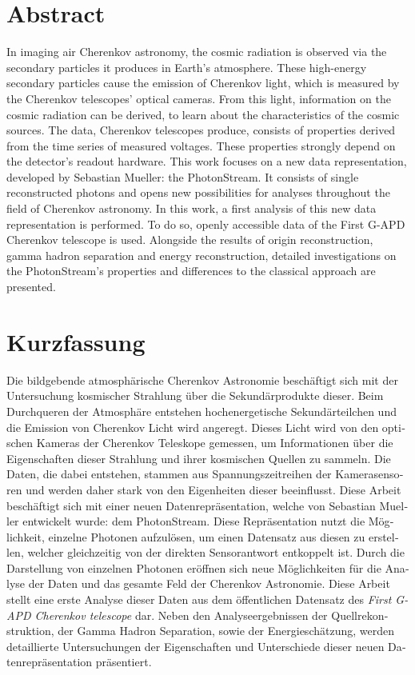 \section*{\color{tugreen}Abstract}
%
In imaging air Cherenkov astronomy, the cosmic radiation is observed via the
secondary particles it produces in Earth's atmosphere. These high-energy secondary
particles cause the emission of Cherenkov light, which is measured by the
Cherenkov telescopes' optical cameras. From this light, information on the
cosmic radiation can be derived, to learn about the characteristics of the
cosmic sources. The data, Cherenkov telescopes produce, consists of
properties derived from the time series of measured voltages. These properties
strongly depend on the detector's readout hardware. This work focuses on a new
data representation, developed by Sebastian Mueller: the PhotonStream. It
consists of single reconstructed photons and opens new possibilities for
analyses throughout the field of Cherenkov astronomy. In this work, a first analysis of this new data representation is
performed. To do so, openly accessible data of the First G-APD Cherenkov
telescope is used. Alongside the results of origin reconstruction, gamma hadron
separation and energy reconstruction, detailed investigations on the
PhotonStream's properties and differences to the classical approach are
presented.

\section*{\color{tugreen}Kurzfassung}
%
\begin{german}
Die bildgebende atmosphärische Cherenkov Astronomie beschäftigt sich mit der
Untersuchung kosmischer Strahlung über die Sekundärprodukte dieser. Beim
Durchqueren der Atmosphäre entstehen hochenergetische Sekundärteilchen und die
Emission von Cherenkov Licht wird angeregt. Dieses Licht wird von den optischen
Kameras der Cherenkov Teleskope gemessen, um Informationen über die
Eigenschaften dieser Strahlung und ihrer kosmischen Quellen zu sammeln. Die
Daten, die dabei entstehen, stammen aus Spannungszeitreihen der Kamerasensoren
und werden daher stark von den Eigenheiten dieser beeinflusst. Diese Arbeit
beschäftigt sich mit einer neuen Datenrepräsentation, welche von Sebastian
Mueller entwickelt wurde: dem PhotonStream. Diese Repräsentation nutzt die
Möglichkeit, einzelne Photonen aufzulösen, um einen Datensatz aus diesen zu
erstellen, welcher gleichzeitig von der direkten Sensorantwort entkoppelt ist.
Durch die Darstellung von einzelnen Photonen eröffnen sich neue Möglichkeiten
für die Analyse der Daten und das gesamte Feld der Cherenkov Astronomie.
Diese Arbeit stellt eine erste Analyse dieser Daten aus dem
öffentlichen Datensatz des \textit{First G-APD Cherenkov telescope} dar. Neben
den Analyseergebnissen der Quellrekonstruktion, der Gamma Hadron Separation,
sowie der Energieschätzung, werden detaillierte Untersuchungen der
Eigenschaften und Unterschiede dieser neuen Datenrepräsentation präsentiert.
\end{german}
